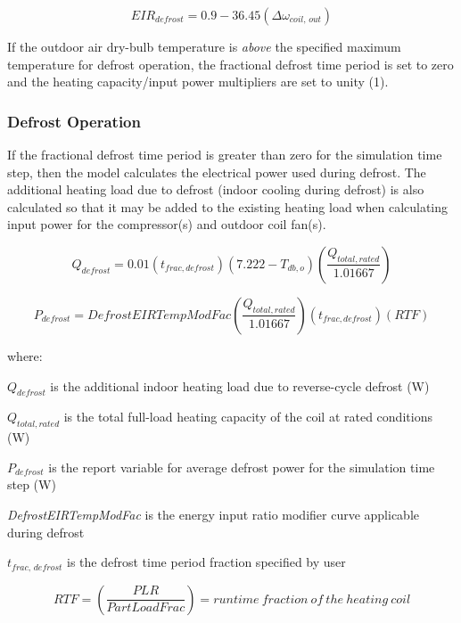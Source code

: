 \begin{equation}
  EIR_{defrost} = 0.9 - 36.45 \left( \Delta \omega_{coil,\,out} \right)
\end{equation}

If the outdoor air dry-bulb temperature is \emph{above} the specified maximum temperature for defrost operation, the fractional defrost time period is set to zero and the heating capacity/input power multipliers are set to unity (1).

\subsubsection{Defrost Operation}\label{defrost-operation-201605050925}

If the fractional defrost time period is greater than zero for the simulation time step, then the model calculates the electrical power used during defrost. The additional heating load due to defrost (indoor cooling during defrost) is also calculated so that it may be added to the existing heating load when calculating input power for the compressor(s) and outdoor coil fan(s).

\begin{equation}
  Q_{defrost} = 0.01 \left( t_{frac,defrost} \right) \left( 7.222 - T_{db,o} \right) \left( \frac{Q_{total,rated}}{1.01667} \right)
\end{equation}

\begin{equation}
  P_{defrost} = DefrostEIRTempModFac \left( \frac{Q_{total,rated}}{1.01667} \right) \left( t_{frac,defrost} \right) \left( RTF \right)
\end{equation}

where:

\(Q_{defrost}\) is the additional indoor heating load due to reverse-cycle defrost (W)

\(Q_{total,rated}\) is the total full-load heating capacity of the coil at rated conditions (W)

\(P_{defrost}\) is the report variable for average defrost power for the simulation time step (W)

\emph{DefrostEIRTempModFac} is the energy input ratio modifier curve applicable during defrost

\(t_{frac,\,defrost}\) is the defrost time period fraction specified by user

\begin{equation}
  RTF = \left(  \frac{PLR}{PartLoadFrac} \right) = runtime~fraction~of~the~heating~coil
\end{equation}

